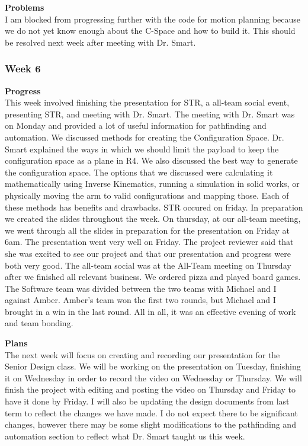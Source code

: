 \textbf{Problems} \\ 
I am blocked from progressing further with the code for motion planning because we do not yet know enough about the C-Space and how to build it. This should be resolved next week after meeting with Dr. Smart.

\subsubsection{Week 6}
\textbf{Progress} \\ 
This week involved finishing the presentation for STR, a all-team social event, presenting STR, and meeting with Dr. Smart. The meeting with Dr. Smart was on Monday and provided a lot of useful information for pathfinding and automation. We discussed methods for creating the Configuration Space. Dr. Smart explained the ways in which we should limit the payload to keep the configuration space as a plane in R4. We also discussed the best way to generate the configuration space. The options that we discussed were calculating it mathematically using Inverse Kinematics, running a simulation in solid works, or physically moving the arm to valid configurations and mapping those. Each of these methods has benefits and drawbacks. STR occured on friday. In preparation we created the slides throughout the week. On thursday, at our all-team meeting, we went through all the slides in preparation for the presentation on Friday at 6am. The presentation went very well on Friday. The project reviewer said that she was excited to see our project and that our presentation and progress were both very good. The all-team social was at the All-Team meeting on Thursday after we finished all relevant business. We ordered pizza and played board games. The Software team was divided between the two teams with Michael and I against Amber. Amber's team won the first two rounds, but Michael and I brought in a win in the last round. All in all, it was an effective evening of work and team bonding.

\textbf{Plans} \\ 
The next week will focus on creating and recording our presentation for the Senior Design class. We will be working on the presentation on Tuesday, finishing it on Wednesday in order to record the video on Wednesday or Thursday. We will finish the project with editing and posting the video on Thursday and Friday to have it done by Friday. I will also be updating the design documents from last term to reflect the changes we have made. I do not expect there to be significant changes, however there may be some slight modifications to the pathfinding and automation section to reflect what Dr. Smart taught us this week.

